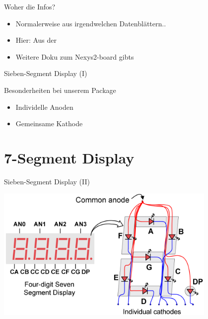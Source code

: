   \begin{frame} [fragile] {Woher die Infos?}
    \begin{block} {}
      \begin{itemize}
        \item Normalerweise aus irgendwelchen Datenblättern..
        \item Hier: Aus der 
              \href{https://users.informatik.haw-hamburg.de/~behn/pub/CEP/FPGA_CE Board.pdf}
                   {}
        \item Weitere Doku zum Nexys2-board gibts 
              \href{http://users.informatik.haw-hamburg.de/~schafers/LOCAL/S19S_CE/DOCU/OLD Digilent Nexys2 Board Reference Manual.pdf}
                   {\color{red}{hier \externalLink}}
      \end{itemize}
    \end{block}
  \end{frame}


  \begin{frame} {Sieben-Segment Display (I)}
    \begin{block} {Besonderheiten bei unserem Package}
      \begin{itemize}
        \item Individelle Anoden
        \item Gemeinsame Kathode
      \end{itemize}
    \end{block}
  \end{frame}

  \section{7-Segment Display}
  \begin{frame} {Sieben-Segment Display (II)}
      \begin{center}
        \includegraphics[width=0.8\textwidth]{figs/7seg_display.png}
      \end{center}
  \end{frame}

